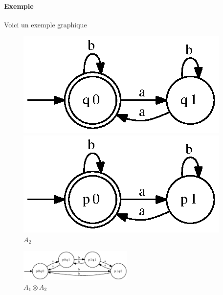\documentclass[a4paper]{article}
\begin{document}
  \paragraph{Exemple} Voici un exemple graphique

  \begin{figure}[H]
    \begin{center}
      \begin{minipage}{0.45\textwidth}
        \includegraphics{fsa/fsa_productA1.eps}
        \caption{$A_1$}
      \end{minipage}\hfill
      \begin{minipage}{0.45\textwidth}
        \includegraphics{fsa/fsa_productA2.eps}
        \caption{$A_2$}
      \end{minipage}
    \end{center}
  \end{figure}

  \begin{figure}[H]
    \begin{center}
      \includegraphics[width=0.5\textwidth]{fsa/fsa_product.eps}
      \caption{$A_1 \otimes A_2$}
    \end{center}
  \end{figure}
\end{document}
